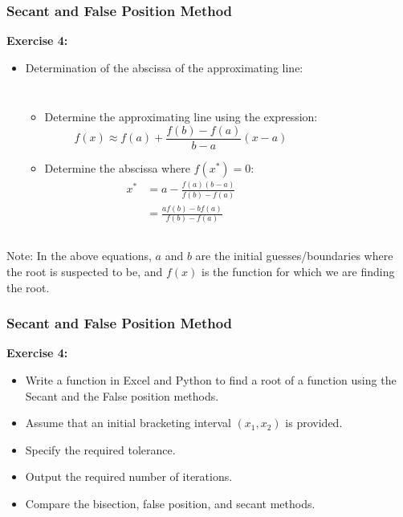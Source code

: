 \begin{frame}[fragile]
  \frametitle{Secant and False Position Method}

  \textbf{Exercise 4:}
  \begin{itemize}
    \item Determination of the abscissa of the approximating line:
          \begin{columns}
            \begin{itemize}
              \item Determine the approximating line using the expression:
                    \[
                      f(x) \approx f(a) + \frac{f(b) - f(a)}{b - a}(x - a)
                    \]
              \item Determine the abscissa where \(f(x^*) = 0\):
                    \begin{align*}
                      x^* & = a - \frac{f(a)(b - a)}{f(b) - f(a)} \\
                          & = \frac{af(b) - bf(a)}{f(b) - f(a)}
                    \end{align*}
            \end{itemize}
            \vspace{0.5cm}
            
          \end{columns}
  \end{itemize}
  Note: In the above equations, \(a\) and \(b\) are the initial guesses/boundaries where the root is suspected to be, and \(f(x)\) is the function for which we are finding the root.
\end{frame}


\begin{frame}[fragile]
  \frametitle{Secant and False Position Method}

  \textbf{Exercise 4:}
  \begin{itemize}
    \item Write a function in Excel and Python to find a root of a function using the Secant and the False position methods.
    \item Assume that an initial bracketing interval \((x_1, x_2)\) is provided.
    \item Specify the required tolerance.
    \item Output the required number of iterations.
    \item Compare the bisection, false position, and secant methods.
  \end{itemize}
\end{frame}

